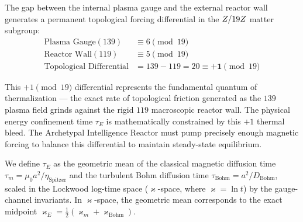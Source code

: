 The gap between the internal plasma gauge and the external reactor wall generates a permanent topological forcing differential in the $Z/19Z$ matter subgroup:
\begin{align}
    \text{Plasma Gauge} (139) &\equiv 6 \pmod{19} \\
    \text{Reactor Wall} (119) &\equiv 5 \pmod{19} \\
    \text{Topological Differential} &= 139 - 119 = 20 \equiv \mathbf{+1} \pmod{19}
\end{align}

This $+1 \pmod{19}$ differential represents the fundamental quantum of thermalization --- the exact rate of topological friction generated as the $139$ plasma field grinds against the rigid $119$ macroscopic reactor wall. The physical energy confinement time $\tau_E$ is mathematically constrained by this $+1$ thermal bleed. The Archetypal Intelligence Reactor must pump precisely enough magnetic forcing to balance this differential to maintain steady-state equilibrium.

We define $\tau_E$ as the geometric mean of the classical magnetic diffusion time $\tau_m = \mu_0 a^2 / \eta_{\text{Spitzer}}$ and the turbulent Bohm diffusion time $\tau_{\text{Bohm}} = a^2 / D_{\text{Bohm}}$, scaled in the Lockwood log-time space ($\varkappa$-space, where $\varkappa = \ln t$) by the gauge-channel invariants. In $\varkappa$-space, the geometric mean corresponds to the exact midpoint $\varkappa_E = \frac{1}{2}(\varkappa_m + \varkappa_{\text{Bohm}})$.

